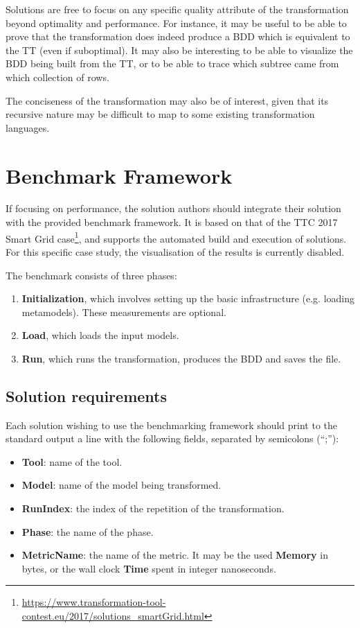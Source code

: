\documentclass[a4paper]{scrartcl}
\begin{document}
Solutions are free to focus on any specific quality attribute of the
transformation beyond optimality and performance. For instance, it may be useful
to be able to prove that the transformation does indeed produce a BDD which is
equivalent to the TT (even if suboptimal). It may also be interesting to be able
to visualize the BDD being built from the TT, or to be able to trace which
subtree came from which collection of rows.

The conciseness of the transformation may also be of interest, given that its
recursive nature may be difficult to map to some existing transformation
languages.

\section{Benchmark Framework}
\label{sec:benchmark-framework}

If focusing on performance, the solution authors should integrate their solution with the provided benchmark framework. It is based on that of the TTC 2017 Smart Grid case\footnote{\url{https://www.transformation-tool-contest.eu/2017/solutions_smartGrid.html}}, and supports the automated build and execution of solutions. For this specific case study, the visualisation of the results is currently disabled.

The benchmark consists of three phases:

\begin{enumerate}
\item \textbf{Initialization}, which involves setting up the basic
  infrastructure (e.g. loading metamodels). These measurements are optional.
\item \textbf{Load}, which loads the input models.
\item \textbf{Run}, which runs the transformation, produces the BDD and saves
  the file.
\end{enumerate}

\subsection{Solution requirements}
\label{sec:solut-requ}

Each solution wishing to use the benchmarking framework should print to the
standard output a line with the following fields, separated by semicolons
(``;''):

\begin{itemize}
\item \textbf{Tool}: name of the tool.
\item \textbf{Model}: name of the model being transformed.
\item \textbf{RunIndex}: the index of the repetition of the transformation.
\item \textbf{Phase}: the name of the phase.
\item \textbf{MetricName}: the name of the metric. It may be the used
  \textbf{Memory} in bytes, or the wall clock \textbf{Time} spent in integer
  nanoseconds.
\end{itemize}
\end{document}
